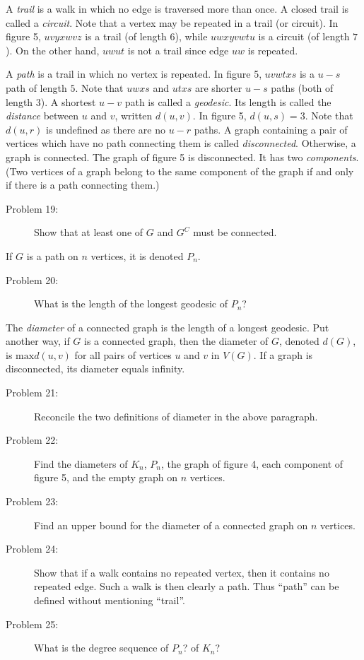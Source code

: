 \documentclass{article}
\begin{document}
A \emph{trail} is a walk in which no edge is traversed more than once. A closed trail is called a \emph{circuit}. Note that a vertex may be repeated in a trail (or circuit). In figure 5, $uvyxwvz$ is a trail (of length $6$), while $uwxyvwtu$ is a circuit (of length $7$). On the other hand, $uwut$ is not a trail since edge $uw$ is repeated. 

A \emph{path} is a trail in which no vertex is repeated. In figure 5, $uvwtxs$ is a $u-s$ path of length $5$. Note that $uwxs$ and $utxs$ are shorter $u-s$ paths (both of length $3$). A shortest $u-v$ path is called a \emph{geodesic}. Its length is called the \emph{distance} between $u$ and $v$, written $d(u,v)$. In figure 5, $d(u,s)=3$. Note that $d(u,r)$ is undefined as there are no $u-r$ paths. A graph containing a pair of vertices which have no path connecting them is called \emph{disconnected}. Otherwise, a graph is connected. The graph of figure 5 is disconnected. It has two \emph{components}. (Two vertices of a graph belong to the same component of the graph if and only if there is a path connecting them.)

\begin{description}
\item[Problem 19:] Show that at least one of $G$ and $G^C$ must be connected.
\end{description}

If $G$ is a path on $n$ vertices, it is denoted $P_n$.

\begin{description}
\item[Problem 20:] What is the length of the longest geodesic of $P_n$?
\end{description}

The \emph{diameter} of a connected graph is the length of a longest geodesic. Put another way, if $G$ is a connected graph, then the diameter of $G$, denoted $d(G)$, is $\text{max}d(u,v)$ for all pairs of vertices $u$ and $v$ in $V(G)$. If a graph is disconnected, its diameter equals infinity.

\begin{description}

\item[Problem 21:] Reconcile the two definitions of diameter in the above paragraph.

\item[Problem 22:] Find the diameters of $K_n$, $P_n$, the graph of figure 4, each component of figure 5, and the empty graph on $n$ vertices.

\item[Problem 23:] Find an upper bound for the diameter of a connected graph on $n$ vertices.

\item[Problem 24:] Show that if a walk contains no repeated vertex, then it contains no repeated edge. Such a walk is then clearly a path. Thus ``path'' can be defined without mentioning ``trail''.

\item[Problem 25:] What is the degree sequence of $P_n$? of $K_n$?

\end{description}
\end{document}
